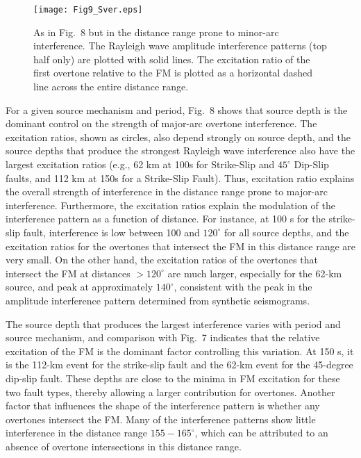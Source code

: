 \documentclass[extra,mreferee]{gji}
\begin{document}
         \begin{figure}
 \texttt{[image: Fig9\_Sver.eps]}
 \caption{As in Fig.\ 8 but in the distance range prone to minor-arc interference. The Rayleigh wave amplitude interference patterns (top half only) are plotted with solid lines. The excitation ratio of the first overtone relative to the FM is plotted as a horizontal dashed line across the entire distance range. }
     \end{figure}     
     
 For a given source mechanism and period, Fig.\ 8 shows that source depth is the dominant control on the strength of major-arc overtone interference. The excitation ratios, shown as circles, also depend strongly on source depth, and the source depths that produce the strongest Rayleigh wave interference also have the largest excitation ratios (e.g., 62 km at 100s for Strike-Slip and $45^\circ$ Dip-Slip faults, and 112 km at 150s for a Strike-Slip Fault). Thus, excitation ratio explains the overall strength of interference in the distance range prone to major-arc interference. Furthermore, the excitation ratios explain the modulation of the interference pattern as a function of distance. For instance, at 100 s for the strike-slip fault, interference is low between 100 and $120^\circ$ for all source depths, and the excitation ratios for the overtones that intersect the FM in this distance range are very small. On the other hand, the excitation ratios of the overtones that intersect the FM at distances $> 120^\circ$ are much larger, especially for the 62-km source, and peak at approximately $140^\circ$, consistent with the peak in the amplitude interference pattern determined from synthetic seismograms. 

The source depth that produces the largest interference varies with period and source mechanism, and comparison with Fig.\ 7 indicates that the relative excitation of the FM is the dominant factor controlling this variation. At 150 s, it is the 112-km event for the strike-slip fault and the 62-km event for the 45-degree dip-slip fault. These depths are close to the minima in FM excitation for these two fault types, thereby allowing a larger contribution for overtones. Another factor that influences the shape of the interference pattern is whether any overtones intersect the FM. Many of the interference patterns show little interference in the distance range $155-165^\circ$, which can be attributed to an absence of overtone intersections in this distance range.  
 
\end{document}
